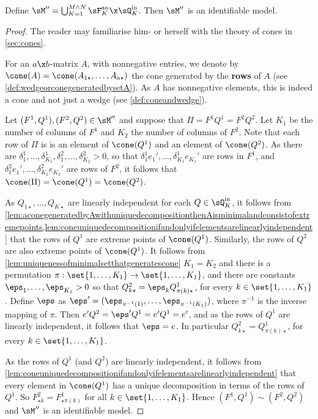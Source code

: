 \documentclass[12pt,a4paper]{article}
\begin{document}
\begin{theorem}\label{thm:identifiabilityanchorinF}
 Define $\sM''=\bigcup_{K=1}^{M\wedge N}\sF_K^{\text{an}}\x \sQ_K^{\text{in}}$. 
    Then $\sM''$ is an identifiable model.  
            \end{theorem} 
\begin{proof}
The reader may familiarise him- or herself with the theory of cones in \cref{sec:cones}. 

For an $a\x b$-matrix $A$, with nonnegative entries, we denote by $\cone(A)=\cone(A_{1\star },\ldots,A_{a \star })$ the cone generated by the \textbf{rows} of $A$ (see \cref{def:wedgeorconegeneratedbysetA}). As $A$ has nonnegative elements, this is indeed a cone and not just a wedge (see \cref{def:coneandwedge}). 

Let $(F^1,Q^1),(F^2,Q^2)\in \sM''$ and suppose that $\Pi=F^1Q^1=F^2Q^2$. Let $K_1$ be the number of columns of $F^1$ and $K_2$ the number of columns of $F^2$.  
Note that each row of $\Pi$ is is an element of $\cone(Q^1)$ and an element of $\cone(Q^2)$. As there are  $\delta_1^1,\ldots,\delta_{K_1}^1,\delta_1^2,\ldots,\delta_{K_2}^2>0$, so that $\delta_1^1 e_1',\ldots,\delta_{K_1}^1e_{K_1}'$ are rows in $F^1$, and $\delta_1^2e_1',\ldots, \delta_{K_2}^2e_{K_2}'$ are rows of  $F^2$, it follows that $\cone(\Pi)= \cone(Q^1)=\cone(Q^2)$. 

As $Q_{1\star},\ldots,Q_{K\star}$ are linearly independent for each $Q\in\sQ_K^{\text{in}}$, it follows from \cref{lem:aconegeneratedbyAwithuniquedecompositionthenAisminimalandconsistofextremepoints,lem:coneuniquedecompositionifandonlyifelementsarelinearlyindependent} that the rows of $Q^1$ are extreme points of $\cone(Q^1)$. Similarly, the rows of $Q^2$ are also extreme points of $\cone(Q^1)$. It follows from \cref{lem:uniquenessofminimalsetthatgeneratescone} $K_1=K_2$ and there  is a permutation $\pi:\set{1,\ldots,K_1}\to \set{1,\ldots,K_1}$, and there are constants $\eps_1,\ldots,\eps_{K_1}>0$ so that $Q_{k\star}^2= \eps_k  Q_{\pi(k)\star}^1$, for every $k\in\set{1,\ldots,K_1}$. Define $\eps$ as $\eps'=(\eps_{\pi^{-1}(1)},\ldots,\eps_{\pi^{-1}(K_1)})$, where $\pi^{-1}$ is the inverse mapping of $\pi$. Then $e'Q^2 = \eps'Q^1=e'Q^1=e'$, and as the rows of $Q^1$ are linearly independent, it follows that $\eps=e$. In particular $Q_{k\star}^2=  Q_{\pi(k)\star}^1$, for every $k\in\set{1,\ldots,K_1}$.

As the rows of $Q^1$ (and $Q^2$) are linearly independent, it follows from \cref{lem:coneuniquedecompositionifandonlyifelementsarelinearlyindependent} that every element in $\cone(Q^1)$ has a unique decomposition in terms of the rows of $Q^1$. So $F^2_{\star k}=F^1_{\star \pi(k)}$ for all $k\in\set{1,\ldots,K_1}$. Hence $(F^1,Q^1)\sim (F^2,Q^2)$ and $\sM''$ is an identifiable model.  
\end{proof}
\end{document}
